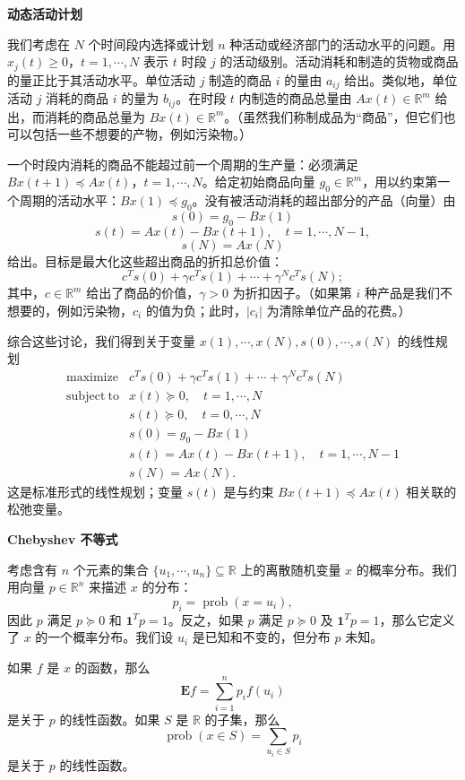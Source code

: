 \documentclass[UTF8,12pt,a4paper,fontset=fandol]{ctexart}
\begin{document}
\noindent\textbf{动态活动计划}

我们考虑在 $N$ 个时间段内选择或计划 $n$ 种活动或经济部门的活动水平的问题。用 $x_j(t)\geq 0$，$t=1,\cdots,N$ 表示 $t$ 时段 $j$ 的活动级别。活动消耗和制造的货物或商品的量正比于其活动水平。单位活动 $j$ 制造的商品 $i$ 的量由 $a_{ij}$ 给出。类似地，单位活动 $j$ 消耗的商品 $i$ 的量为 $b_{ij}$。在时段 $t$ 内制造的商品总量由 $Ax(t)\in\mathbb{R}^m$ 给出，而消耗的商品总量为 $Bx(t)\in\mathbb{R}^m$。（虽然我们称制成品为“商品”，但它们也可以包括一些不想要的产物，例如污染物。）

一个时段内消耗的商品不能超过前一个周期的生产量：必须满足 $Bx(t+1)\preceq Ax(t)$，$t=1,\cdots,N$。给定初始商品向量 $g_0\in\mathbb{R}^m$，用以约束第一个周期的活动水平：$Bx(1)\preceq g_0$。没有被活动消耗的超出部分的产品（向量）由
\[
s(0)=g_0-Bx(1)
\]
\[
s(t)=Ax(t)-Bx(t+1),\quad t=1,\cdots,N-1,
\]
\[
s(N)=Ax(N)
\]
给出。目标是最大化这些超出商品的折扣总价值：
\[
c^Ts(0)+\gamma c^Ts(1)+\cdots+\gamma^N c^Ts(N);
\]
其中，$c\in\mathbb{R}^m$ 给出了商品的价值，$\gamma>0$ 为折扣因子。（如果第 $i$ 种产品是我们不想要的，例如污染物，$c_i$ 的值为负；此时，$|c_i|$ 为清除单位产品的花费。）

综合这些讨论，我们得到关于变量 $x(1),\cdots,x(N),s(0),\cdots,s(N)$ 的线性规划
\[
\begin{array}{ll}
\mathop{\mathrm{maximize}} & c^Ts(0)+\gamma c^Ts(1)+\cdots+\gamma^N c^Ts(N)\\
\mathrm{subject\ to} & x(t)\succeq 0,\quad t=1,\cdots,N\\
& s(t)\succeq 0,\quad t=0,\cdots,N\\
& s(0)=g_0-Bx(1)\\
& s(t)=Ax(t)-Bx(t+1),\quad t=1,\cdots,N-1\\
& s(N)=Ax(N).
\end{array}
\]
这是标准形式的线性规划；变量 $s(t)$ 是与约束 $Bx(t+1)\preceq Ax(t)$ 相关联的松弛变量。

\noindent\textbf{Chebyshev 不等式}

考虑含有 $n$ 个元素的集合 $\{u_1,\cdots,u_n\}\subseteq\mathbb{R}$ 上的离散随机变量 $x$ 的概率分布。我们用向量 $p\in\mathbb{R}^n$ 来描述 $x$ 的分布：
\[
p_i=\operatorname{prob}(x=u_i),
\]
因此 $p$ 满足 $p\succeq 0$ 和 $\mathbf{1}^Tp=1$。反之，如果 $p$ 满足 $p\succeq 0$ 及 $\mathbf{1}^Tp=1$，那么它定义了 $x$ 的一个概率分布。我们设 $u_i$ 是已知和不变的，但分布 $p$ 未知。

如果 $f$ 是 $x$ 的函数，那么
\[
\mathbf{E}f=\sum_{i=1}^{n}p_i f(u_i)
\]
是关于 $p$ 的线性函数。如果 $S$ 是 $\mathbb{R}$ 的子集，那么
\[
\operatorname{prob}(x\in S)=\sum_{u_i\in S}p_i
\]
是关于 $p$ 的线性函数。
\end{document}
